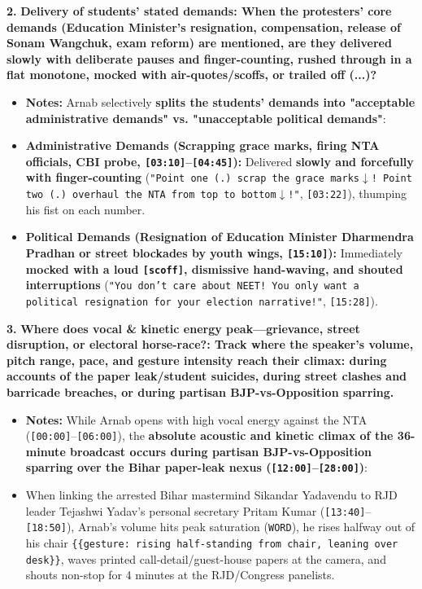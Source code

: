 \documentclass[10pt,a4paper]{article}
\begin{document}
\noindent\textbf{2.} \textbf{Delivery of students' stated demands: When the protesters' core demands (Education Minister's resignation, compensation, release of Sonam Wangchuk, exam reform) are mentioned, are they delivered slowly with deliberate pauses and finger-counting, rushed through in a flat monotone, mocked with air-quotes/scoffs, or trailed off (...)?}\par\smallskip
\begin{itemize}
  \item \textbf{Notes:}
Arnab selectively \textbf{splits the students' demands into "acceptable administrative demands" vs. "unacceptable political demands"}:\par\smallskip
  \item \textbf{Administrative Demands (Scrapping grace marks, firing NTA officials, CBI probe, \texttt{[03:10]}--\texttt{[04:45]}):} Delivered \textbf{slowly and forcefully with finger-counting} (\texttt{"Point one (.) scrap the grace marks$\downarrow$! Point two (.) overhaul the NTA from top to bottom$\downarrow$!"}, \texttt{[03:22]}), thumping his fist on each number.
  \item \textbf{Political Demands (Resignation of Education Minister Dharmendra Pradhan or street blockades by youth wings, \texttt{[15:10]}):} Immediately \textbf{mocked with a loud \texttt{[scoff]}, dismissive hand-waving, and shouted interruptions} (\texttt{"You don't care about NEET! You only want a political resignation for your election narrative!"}, \texttt{[15:28]}).
\end{itemize}

\noindent\textbf{3.} \textbf{Where does vocal \& kinetic energy peak---grievance, street disruption, or electoral horse-race?: Track where the speaker's volume, pitch range, pace, and gesture intensity reach their climax: during accounts of the paper leak/student suicides, during street clashes and barricade breaches, or during partisan BJP-vs-Opposition sparring.}\par\smallskip
\begin{itemize}
  \item \textbf{Notes:}
While Arnab opens with high vocal energy against the NTA (\texttt{[00:00]}--\texttt{[06:00]}), the \textbf{absolute acoustic and kinetic climax of the 36-minute broadcast occurs during partisan BJP-vs-Opposition sparring over the Bihar paper-leak nexus (\texttt{[12:00]}--\texttt{[28:00]})}:\par\smallskip
  \item When linking the arrested Bihar mastermind Sikandar Yadavendu to RJD leader Tejashwi Yadav's personal secretary Pritam Kumar (\texttt{[13:40]}--\texttt{[18:50]}), Arnab's volume hits peak saturation (\texttt{WORD}), he rises halfway out of his chair \texttt{\{\{gesture: rising half-standing from chair, leaning over desk\}\}}, waves printed call-detail/guest-house papers at the camera, and shouts non-stop for 4 minutes at the RJD/Congress panelists.
\end{itemize}
\end{document}
